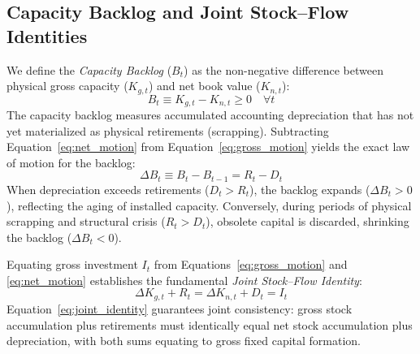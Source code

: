 \subsection{Capacity Backlog and Joint Stock--Flow Identities}
We define the \emph{Capacity Backlog} ($B_t$) as the non-negative difference between physical gross capacity ($K_{g,t}$) and net book value ($K_{n,t}$):
\begin{equation}\label{eq:backlog_def}
B_t \equiv K_{g,t} - K_{n,t} \ge 0 \quad \forall t
\end{equation}
The capacity backlog measures accumulated accounting depreciation that has not yet materialized as physical retirements (scrapping). Subtracting Equation~\eqref{eq:net_motion} from Equation~\eqref{eq:gross_motion} yields the exact law of motion for the backlog:
\begin{equation}\label{eq:backlog_motion}
\Delta B_t \equiv B_t - B_{t-1} = R_t - D_t
\end{equation}
When depreciation exceeds retirements ($D_t > R_t$), the backlog expands ($\Delta B_t > 0$), reflecting the aging of installed capacity. Conversely, during periods of physical scrapping and structural crisis ($R_t > D_t$), obsolete capital is discarded, shrinking the backlog ($\Delta B_t < 0$).

Equating gross investment $I_t$ from Equations~\eqref{eq:gross_motion} and \eqref{eq:net_motion} establishes the fundamental \emph{Joint Stock--Flow Identity}:
\begin{equation}\label{eq:joint_identity}
\Delta K_{g,t} + R_t = \Delta K_{n,t} + D_t = I_t
\end{equation}
Equation~\eqref{eq:joint_identity} guarantees joint consistency: gross stock accumulation plus retirements must identically equal net stock accumulation plus depreciation, with both sums equating to gross fixed capital formation.


